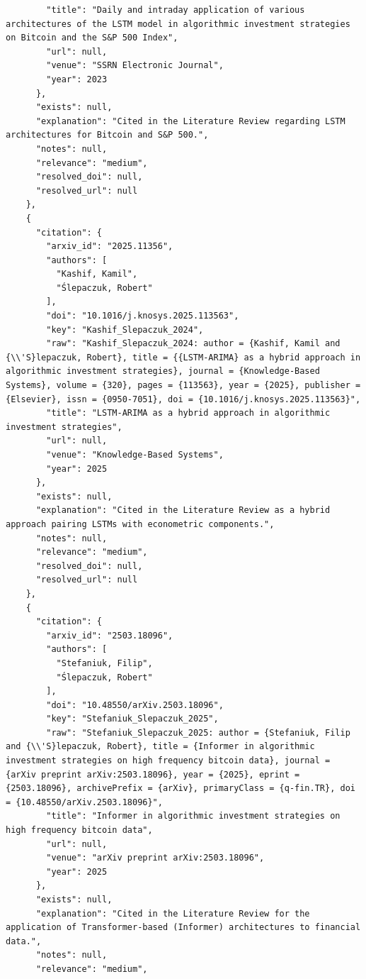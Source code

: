 \documentclass[11pt]{article}
\begin{document}
\begin{verbatim}
        "title": "Daily and intraday application of various architectures of the LSTM model in algorithmic investment strategies on Bitcoin and the S&P 500 Index",
        "url": null,
        "venue": "SSRN Electronic Journal",
        "year": 2023
      },
      "exists": null,
      "explanation": "Cited in the Literature Review regarding LSTM architectures for Bitcoin and S&P 500.",
      "notes": null,
      "relevance": "medium",
      "resolved_doi": null,
      "resolved_url": null
    },
    {
      "citation": {
        "arxiv_id": "2025.11356",
        "authors": [
          "Kashif, Kamil",
          "Ślepaczuk, Robert"
        ],
        "doi": "10.1016/j.knosys.2025.113563",
        "key": "Kashif_Slepaczuk_2024",
        "raw": "Kashif_Slepaczuk_2024: author = {Kashif, Kamil and {\\'S}lepaczuk, Robert}, title = {{LSTM-ARIMA} as a hybrid approach in algorithmic investment strategies}, journal = {Knowledge-Based Systems}, volume = {320}, pages = {113563}, year = {2025}, publisher = {Elsevier}, issn = {0950-7051}, doi = {10.1016/j.knosys.2025.113563}",
        "title": "LSTM-ARIMA as a hybrid approach in algorithmic investment strategies",
        "url": null,
        "venue": "Knowledge-Based Systems",
        "year": 2025
      },
      "exists": null,
      "explanation": "Cited in the Literature Review as a hybrid approach pairing LSTMs with econometric components.",
      "notes": null,
      "relevance": "medium",
      "resolved_doi": null,
      "resolved_url": null
    },
    {
      "citation": {
        "arxiv_id": "2503.18096",
        "authors": [
          "Stefaniuk, Filip",
          "Ślepaczuk, Robert"
        ],
        "doi": "10.48550/arXiv.2503.18096",
        "key": "Stefaniuk_Slepaczuk_2025",
        "raw": "Stefaniuk_Slepaczuk_2025: author = {Stefaniuk, Filip and {\\'S}lepaczuk, Robert}, title = {Informer in algorithmic investment strategies on high frequency bitcoin data}, journal = {arXiv preprint arXiv:2503.18096}, year = {2025}, eprint = {2503.18096}, archivePrefix = {arXiv}, primaryClass = {q-fin.TR}, doi = {10.48550/arXiv.2503.18096}",
        "title": "Informer in algorithmic investment strategies on high frequency bitcoin data",
        "url": null,
        "venue": "arXiv preprint arXiv:2503.18096",
        "year": 2025
      },
      "exists": null,
      "explanation": "Cited in the Literature Review for the application of Transformer-based (Informer) architectures to financial data.",
      "notes": null,
      "relevance": "medium",

\end{verbatim}
\end{document}

